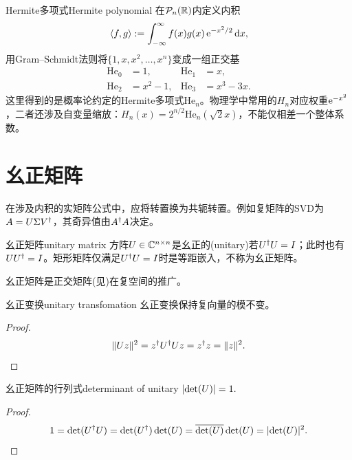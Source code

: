 \begin{example}{Hermite多项式}{Hermite polynomial}
	在$\mathcal{P}_n(\mathbb{R})$内定义内积
	\begin{equation}\label{eq:la-hermite-inner-product}
		\langle f,g\rangle := \int_{-\infty}^\infty f(x)g(x)\mathop{}\!\mathrm{e}^{-x^2/2}\mathop{}\!\mathrm{d} x,
	\end{equation}
	用Gram--Schmidt法则将$\{1,x,x^2,\ldots,x^n\}$变成一组正交基
	\begin{equation}\label{eq:la-hermite-first-polynomials}
		\begin{aligned}
	        \mathrm{He}_0 &= 1, &\mathrm{He}_1 &= x,\\
	        \mathrm{He}_2 &= x^2 - 1, &\mathrm{He}_3 &= x^3 - 3x.
		\end{aligned}
	\end{equation}
	这里得到的是概率论约定的Hermite多项式$\mathrm{He}_n$。物理学中常用的$H_n$对应权重$\mathop{}\!\mathrm{e}^{-x^2}$，二者还涉及自变量缩放：$H_n(x) = 2^{n/2}\mathrm{He}_n(\sqrt2x)$，不能仅相差一个整体系数。
\end{example}

\section{幺正矩阵}

在涉及内积的实矩阵公式中，应将转置换为共轭转置。例如复矩阵的SVD为$A = U\Sigma V^\dagger$，其奇异值由$A^\dagger A$决定。

\begin{definition}{幺正矩阵}{unitary matrix}
	方阵$U \in \mathbb{C}^{n\times n}$是幺正的(unitary)若$U^\dagger U = I$；此时也有$UU^\dagger = I$。矩形矩阵仅满足$U^\dagger U = I$时是等距嵌入，不称为幺正矩阵。
\end{definition}
幺正矩阵是正交矩阵(见)在复空间的推广。
\begin{theorem}{幺正变换}{unitary transfomation}
	幺正变换保持复向量的模不变。
\end{theorem}
\begin{proof}
	\[
		\lVert Uz\rVert^2 = z^\dagger U^\dagger Uz = z^\dagger z = \lVert z\rVert^2.
		\qedhere
	\]
\end{proof}
\begin{theorem}{幺正矩阵的行列式}{determinant of unitary}
	$\lvert\det(U)\rvert = 1.$
\end{theorem}
\begin{proof}
	\[
		1 = \det(U^\dagger U) = \det(U^\dagger)\det(U) = \overline{\det(U)}\det(U) = \lvert\det(U)\rvert^2.
		\qedhere
	\]
\end{proof}

